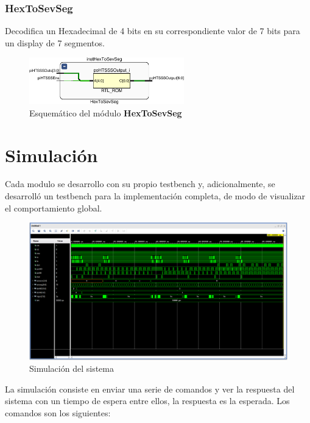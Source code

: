 \documentclass[12pt]{article}
\begin{document}
\subsubsection{HexToSevSeg}
Decodifica un Hexadecimal de 4 bits en su correspondiente valor de 7 bits para un display de 7 segmentos.
\begin{figure}[H]
    \centering
    \includegraphics[width=0.6\textwidth]{hex-to-sev-seg-crop}
    \caption{Esquemático del módulo \textbf{HexToSevSeg}}
\end{figure}

\section{Simulación}

Cada modulo se desarrollo con su propio testbench y, adicionalmente, se desarrolló un testbench para la implementación completa, de modo de visualizar el comportamiento global.

\begin{figure}[H]
    \centering
    \includegraphics[width=\textwidth]{sim1}
    \caption{Simulación del sistema}
\end{figure}

La simulación consiste en enviar una serie de comandos y ver la respuesta del sistema con un tiempo de espera entre ellos, la respuesta es la esperada. Los comandos son los siguientes:
\end{document}

